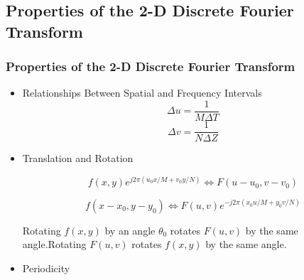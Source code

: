 \documentclass[notheorems, serif, table, compress]{beamer}  %
\begin{document}

\subsection{Properties of the 2-D Discrete Fourier Transform}%

\begin{frame}
\frametitle{Properties of the 2-D Discrete Fourier Transform}
    
\begin{itemize}
 \item Relationships Between Spatial and Frequency Intervals%
\begin{equation} \label{5}
\Delta u=\frac{1}{M\Delta T}
\end{equation}
\begin{equation} \label{6}
\Delta v=\frac{1}{N\Delta Z}
\end{equation} 
 \item Translation and Rotation %

\begin{equation} \label{7}
f(x,y)e^{j2\pi (u_{0}x/M+v_{0}y/N)}\Leftrightarrow F(u-u_{0},v-v_{0})
\end{equation}

\begin{equation} \label{8}
f(x-x_{0},y-y_{0})\Leftrightarrow F(u,v)e^{-j2\pi (x_{0}u/M+y_{0}v/N)}
\end{equation}

Rotating $f(x,y)$ by an angle $\theta_{0}$ rotates $F(u,v)$ by the same angle.Rotating $F(u,v)$ rotates $f(x,y)$ by the same angle.


\item Periodicity %

\end{itemize}

\end{frame}
\end{document}
